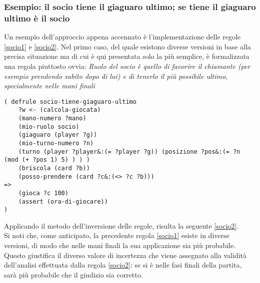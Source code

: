
\subsubsection*{Esempio: il socio tiene il giaguaro ultimo; se tiene il giaguaro ultimo è il socio}
Un esempio dell'approccio appena accennato è l'implementazione delle regole \ref{socio1} e \ref{socio2}.
Nel primo caso, del quale esistono diverse versioni in base alla precisa situazione ma di cui è qui presentata solo la più semplice, è formalizzata una regola piuttosto ovvia:
\emph{Ruolo del socio è quello di favorire il chiamante (per esempio prendendo subito dopo di lui) e di tenerlo il più possibile ultimo, specialmente nelle mani finali}

\begin{lstlisting}[caption={Se sono il socio e gioco subito dopo di lui, prendo per lasciarlo ultimo la mano successiva},label=socio1]
( defrule socio-tiene-giaguaro-ultimo
    ?w <- (calcola-giocata)
    (mano-numero ?mano)
    (mio-ruolo socio)
    (giaguaro (player ?g))
    (mio-turno-numero ?n)
    (turno (player ?player&:(= ?player ?g)) (posizione ?pos&:(= ?n (mod (+ ?pos 1) 5) ) ) )
    (briscola (card ?b))
    (posso-prendere (card ?c&:(<> ?c ?b)))
=>
    (gioca ?c 100)
    (assert (ora-di-giocare))
)
\end{lstlisting}

Applicando il metodo dell'inversione delle regole, risulta la seguente \ref{socio2}.\\
Si noti che, come anticipato, la precedente regola \ref{socio1} esiste in diverse versioni, di modo che nelle mani finali la sua applicazione sia più probabile. Questo giustifica il diverso valore di incertezza che viene assegnato alla validità dell'analisi effettuata dalla regola \ref{socio2}: se si è nelle fasi finali della partita, sarà più probabile che il giudizio sia corretto.



